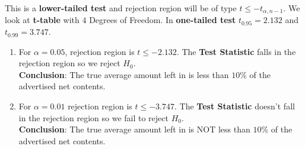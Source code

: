 \begin{enumerate}
This is a \textbf{lower-tailed test} and rejection region will be of type $t \leq -t_{\alpha , n - 1}$.
We look at \textbf{t-table} with $4$ Degrees of Freedom. In \textbf{one-tailed test} $t_{0.95} = 2.132$ and $t_{0.99} = 3.747$.
\begin{enumerate}
\item 
For $\alpha = 0.05$, rejection region is $t \leq -2.132$. The \textbf{Test Statistic} falls in the rejection region so we reject $H_0$.\\
\textbf{Conclusion}: The true average amount left  in is less than $10$\% of the advertised net contents.

\item 
For $\alpha = 0.01$ rejection region is $t \leq -3.747$. The \textbf{Test Statistic} doesn't fall in the rejection region so we fail to reject $H_0$.\\
\textbf{Conclusion}: The true average amount left  in is NOT less than $10$\% of the advertised net contents.
\end{enumerate}

\end{enumerate}

